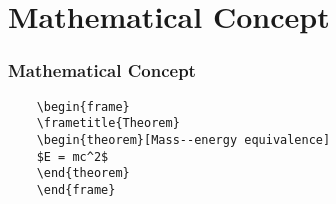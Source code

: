 \section{Mathematical Concept}

\begin{frame}[fragile] %
    \frametitle{Mathematical Concept}
    \begin{example}
    \begin{verbatim}
    \begin{frame}
    \frametitle{Theorem}
    \begin{theorem}[Mass--energy equivalence]
    $E = mc^2$
    \end{theorem}
    \end{frame}\end{verbatim}
    \end{example}
\end{frame}